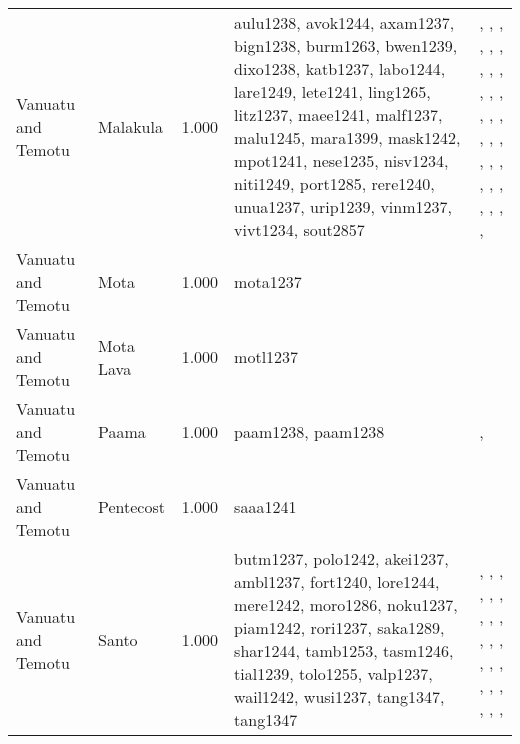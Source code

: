 \begin{longtable}{p{1.8cm}p{1.8cm}p{1.8cm}p{2cm}p{7cm}}
  Vanuatu and Temotu & Malakula & 1.000 & aulu1238, avok1244, axam1237, bign1238, burm1263, bwen1239, dixo1238, katb1237, labo1244, lare1249, lete1241, ling1265, litz1237, maee1241, malf1237, malu1245, mara1399, mask1242, mpot1241, nese1235, nisv1234, niti1249, port1285, rere1240, unua1237, urip1239, vinm1237, vivt1234, sout2857 & \citet{bonnemaison1996power}, \citet{bonnemaison1996power}, \citet{bonnemaison1996power}, \citet{bonnemaison1996power}, \citet{bonnemaison1996power}, \citet{bonnemaison1996power}, \citet{bonnemaison1996power}, \citet{bonnemaison1996power}, \citet{bonnemaison1996power}, \citet{bonnemaison1996power}, \citet{bonnemaison1996power}, \citet{bonnemaison1996power}, \citet{bonnemaison1996power}, \citet{bonnemaison1996power}, \citet{bonnemaison1996power}, \citet{bonnemaison1996power}, \citet{bonnemaison1996power}, \citet{bonnemaison1996power}, \citet{bonnemaison1996power}, \citet{bonnemaison1996power}, \citet{bonnemaison1996power}, \citet{bonnemaison1996power}, \citet{bonnemaison1996power}, \citet{bonnemaison1996power}, \citet{bonnemaison1996power}, \citet{bonnemaison1996power}, \citet{bonnemaison1996power}, \citet{bonnemaison1996power}, \citet{deacon1934} \\ 
  Vanuatu and Temotu & Mota & 1.000 & mota1237 & \citet{bonnemaison1996power} \\ 
  Vanuatu and Temotu & Mota Lava & 1.000 & motl1237 & \citet{bonnemaison1996power} \\ 
  Vanuatu and Temotu & Paama & 1.000 & paam1238, paam1238 & \citet{bonnemaison1996power}, \citet{bonnemaison1996power} \\ 
  Vanuatu and Temotu & Pentecost & 1.000 & saaa1241 & \citet{lane1956} \\ 
  Vanuatu and Temotu & Santo & 1.000 & butm1237, polo1242, akei1237, ambl1237, fort1240, lore1244, mere1242, moro1286, noku1237, piam1242, rori1237, saka1289, shar1244, tamb1253, tasm1246, tial1239, tolo1255, valp1237, wail1242, wusi1237, tang1347, tang1347 & \citet{bonnemaison1996power}, \citet{bonnemaison1996power}, \citet{bonnemaison1996power}, \citet{bonnemaison1996power}, \citet{bonnemaison1996power}, \citet{bonnemaison1996power}, \citet{bonnemaison1996power}, \citet{bonnemaison1996power}, \citet{bonnemaison1996power}, \citet{bonnemaison1996power}, \citet{bonnemaison1996power}, \citet{bonnemaison1996power}, \citet{bonnemaison1996power}, \citet{bonnemaison1996power}, \citet{bonnemaison1996power}, \citet{bonnemaison1996power}, \citet{bonnemaison1996power}, \citet{bonnemaison1996power}, \citet{bonnemaison1996power}, \citet{bonnemaison1996power}, \citet{bonnemaison1996power}, \citet{bonnemaison1996power} \\ 

\end{longtable}
